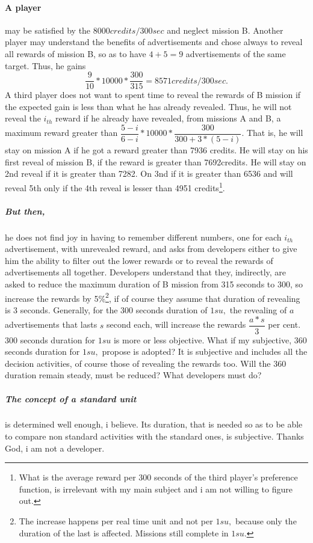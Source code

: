 \documentclass[]{article}
\begin{document}
\paragraph*{A player} may be satisfied by the $8000credits/300sec$ and neglect mission B. Another player may understand the benefits of advertisements and chose always to reveal all rewards of mission B, so as to have $4+5=9$ advertisements of the same target. Thus, he gains \[ \dfrac{9}{10}*10000*\dfrac{300}{315}=8571credits/300sec.\]
A third player does not want to spent time to reveal the rewards of B mission if the expected gain is less than what he has already revealed. Thus, he will not reveal the $i_{th}$ reward if he already have revealed, from missions A and B, a maximum reward greater than $\dfrac{5-i}{6-i}*10000*\dfrac{300}{300+3*(5-i)}.$ That is, he will stay on mission A if he got a reward greater than 7936 credits. He will stay on his first reveal of mission B, if the reward is greater than 7692credits. He will stay on 2nd reveal if it is greater than 7282. On 3nd if it is greater than 6536 and will reveal 5th only if the 4th reveal is lesser than 4951 credits\footnote{What is the average reward per 300 seconds of the third player's preference function, is irrelevant with my main subject and i am not willing to figure out.}.
\subparagraph*{But then,} he does not find joy in having to remember different numbers, one for each $i_{th}$ advertisement, with unrevealed reward, and asks from developers either to give him the ability to filter out the lower rewards or to reveal the rewards of advertisements all together. Developers understand that they, indirectly, are asked to reduce the maximum duration of B mission from 315 seconds to  300, so increase the rewards by 5\%\footnote{The increase happens per real time unit and not per $1su,$ because only the duration of the last is affected. Missions still complete in $1su.$}, if of course they assume that duration of revealing is 3 seconds. Generally, for the 300 seconds duration of $1su,$ the revealing of $a$ advertisements that lasts $s$ second each, will increase the rewards $\dfrac{a*s}{3}$ per cent. 300 seconds duration for $1su$ is more or less objective. What if my subjective, 360 seconds duration for $1su,$ propose is adopted? It is subjective and includes all the decision activities, of course those of revealing the rewards too. Will the 360 duration remain steady, must be reduced? What developers must do?
\subparagraph*{The concept of a standard unit} is determined well enough, i believe. Its duration, that is needed so as to be able to compare non standard activities with the standard ones, is subjective. Thanks God, i am not a developer.
\end{document}
